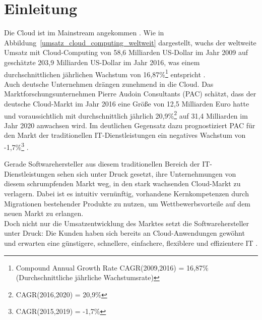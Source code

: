 \section{Einleitung}
\label{cha:einleitung}
Die Cloud ist im Mainstream angekommen . Wie in
Abbildung~\ref{umsatz_cloud_computing_weltweit} dargestellt, wuchs der
weltweite Umsatz mit Cloud-Computing von 58,6 Milliarden US-Dollar im
Jahr 2009 auf geschätzte 203,9 Milliarden US-Dollar im Jahr 2016, was einem
durchschnittlichen jährlichen Wachstum von 16,87\%\footnote{Compound Annual Growth Rate CAGR(2009,2016) =
16,87\% (Durchschnittliche jährliche Wachstumsrate)} entspricht . \\
Auch deutsche Unternehmen drängen zunehmend in die Cloud. Das
Marktforschungsunternehmen Pierre Audoin Consultants (PAC) schätzt, dass der
deutsche Cloud-Markt im Jahr 2016 eine Größe von 12,5 Milliarden Euro hatte und
voraussichtlich mit durchschnittlich jährlich 20,9\%\footnote{CAGR(2016,2020) = 20,9\%} auf 31,4
Milliarden im Jahr 2020 anwachsen wird. Im deutlichen Gegensatz dazu prognostiziert
PAC für den Markt der traditionellen IT-Dienstleistungen ein negatives Wachstum
von  -1,7\%\footnote{CAGR(2015,2019) = -1,7\%} .



Gerade Softwarehersteller aus diesem traditionellen Bereich der
IT-Dienstleistungen sehen sich unter Druck gesetzt, ihre
Unternehmungen von diesem schrumpfenden Markt weg, in den stark wachsenden
Cloud-Markt zu verlagern. Dabei ist es intuitiv vernünftig, vorhandene
Kernkompetenzen durch Migrationen bestehender Produkte zu nutzen, um
Wettbewerbsvorteile auf dem neuen Markt zu erlangen. \\
Doch nicht nur die Umsatzentwicklung des Marktes setzt die Softwarehersteller
unter Druck: Die Kunden haben sich bereits an Cloud-Anwendungen gewöhnt und
erwarten eine günstigere, schnellere, einfachere, flexiblere
und effizientere IT .
\begin{comment}
Günstiger, weil bei der Beschaffung, der Wartung und dem
Betrieb des Rechenzentrums Skalenerträge erzielt werden können. Schneller, weil
Cloud-Anbieter Leistungsreserven in einem Umfang bilden können und müssen, wie
es für einzelne Firmen in ihren IT-Landschaften kaum möglich ist. Einfacher,
weil Cloud-Dienste in der Regel auch mit Mobilgeräten gut bedienbar sind.
Flexibler, weil sich Leistungen unkompliziert über das Internet buchen lassen
und automatisch skalieren. Effizienter, weil nur der Umfang bezahlt wird,
der auch genutzt wird. \pcite{}{}{economics_of_the_cloud} \\
\end{comment}

